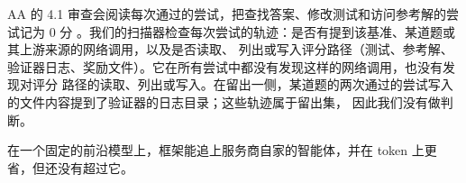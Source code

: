 AA 的 4.1 审查会阅读每次通过的尝试，把查找答案、修改测试和访问参考解的尝试记为 0 分
\citep{aa2026coding}。我们的扫描器检查每次尝试的轨迹：是否有提到该基准、某道题或其上游来源的网络调用，以及是否读取、
列出或写入评分路径（测试、参考解、验证器日志、奖励文件）。它在所有尝试中都没有发现这样的网络调用，也没有发现对评分
路径的读取、列出或写入。在留出一侧，某道题的两次通过的尝试写入的文件内容提到了验证器的日志目录；这些轨迹属于留出集，
因此我们没有做判断。

在一个固定的前沿模型上，框架能追上服务商自家的智能体，并在 token 上更省，但还没有超过它。
